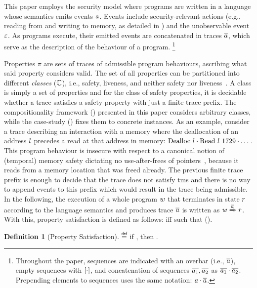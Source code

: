 \documentclass[dvipsnames,conference]{IEEEtran}
\theoremstyle{definition}
\newtheorem{definition}{Definition}[section]
\begin{document}
This paper employs the security model where programs are written in a language whose semantics emits events $\event$.
Events include security-relevant actions (e.g., reading from and writing to memory, as detailed in ) and the unobservable event $\emptyevent$.
As programs execute, their emitted events are concatenated in traces $\trace$, which serve as the description of the behaviour of a program.%
\footnote{
Throughout the paper, sequences are indicated with an overbar (i.e., $\trace$), empty sequences with $\hole{\cdot}$, and concatenation of sequences $\trace[_{1}],\trace[_{2}]$ as $\trace[_{1}]\cdot\trace[_{2}]$.
Prepending elements to sequences uses the same notation: $\event\cdot\trace$.
}

Properties $\pi$ are sets of traces of admissible program behaviours, ascribing what said property considers valid.
The set of all properties can be partitioned into different {\em classes} ($\class$), i.e., safety, liveness, and neither safety nor liveness~\cite{clarkson2008hyper}.
A class is simply a set of properties and for the class of safety properties, it is decidable whether a trace satisfies a safety property with just a finite trace prefix.
The compositionality framework () presented in this paper considers arbitrary classes, while the case-study () fixes them to concrete instances.
As an example, consider a trace describing an interaction with a memory where the deallocation of an address $\loc$ precedes a read at that address in memory: $\ev{Dealloc\ \loc}\cdot\ev{Read\ \loc\ 1729}\cdot\dots$.
This program behaviour is insecure with respect to a canonical notion of (temporal) memory safety dictating no use-after-frees of pointers~\cite{nagarakatte2010cets,azevedo2018meaningsofms}, because it reads from a memory location that was freed already.
The previous finite trace prefix is enough to decide that the trace does not satisfy \gls*{tms} and there is no way to append events to this prefix which would result in the trace being admissible.
In the following, the execution of a whole program $\wholeprogvar$ that terminates in state $\runtimetermvar$ according to the language semantics and produces trace $\trace$ is written as $\progstepto{\wholeprogvar}{\runtimetermvar}{\trace}$.
With this, property satisfaction is defined as follows:
 iff  such that  ().

\begin{definition}[Property Satisfaction]\label{def:propsat}
    \bul{$\sat{\progvar}{\pi}$}
    $\isdef$
    if \iul{$\forall\runtimetermvar\ \trace,\progstepto{\progvar}{\runtimetermvar}{\trace}$},
    then \oul{$\trace\in\pi$}.
\end{definition}
\end{document}
